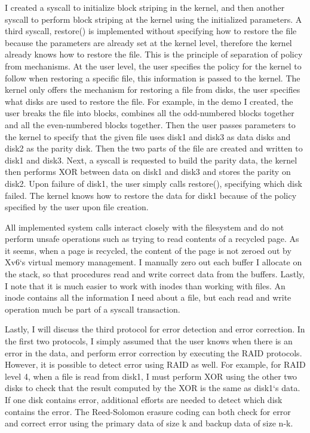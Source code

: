 I created a syscall to initialize block striping in the kernel, and then another syscall to perform block striping at the kernel using the initialized parameters. A third syscall, restore() is implemented without specifying how to restore the file because the parameters are already set at the kernel level, therefore the kernel already knows how to restore the file. This is the principle of separation of policy from mechanisms. At the user level, the user specifies the policy for the kernel to follow when restoring a specific file, this information is passed to the kernel. The kernel only offers the mechanism for restoring a file from disks, the user specifies what disks are used to restore the file. For example, in the demo I created, the user breaks the file into blocks, combines all the odd-numbered blocks together and all the even-numbered blocks together. Then the user passes parameters to the kernel to specify that the given file uses disk1 and disk3 as data disks and disk2 as the parity disk. Then the two parts of the file are created and written to disk1 and disk3. Next, a syscall is requested to build the parity data, the kernel then performs XOR between data on disk1 and disk3 and stores the parity on disk2. Upon failure of disk1, the user simply calls restore(), specifying which disk failed. The kernel knows how to restore the data for disk1 because of the policy specified by the user upon file creation. 

All implemented system calls interact closely with the filesystem and do not perform unsafe operations such as trying to read contents of a recycled page. As it seems, when a page is recycled, the content of the page is not zeroed out by Xv6`s virtual memory management. I manually zero out each buffer I allocate on the stack, so that procedures read and write correct data from the buffers. Lastly, I note that it is much easier to work with inodes than working with files. An inode contains all the information I need about a file, but each read and write operation much be part of a syscall transaction. 

Lastly, I will discuss the third protocol for error detection and error correction. In the first two protocols, I simply assumed that the user knows when there is an error in the data, and perform error correction by executing the RAID protocols. However, it is possible to detect error using RAID as well. For example, for RAID level 4, when a file is read from disk1, I must perform XOR using the other two disks to check that the result computed by the XOR is the same as disk1`s data. If one disk contains error, additional efforts are needed to detect which disk contains the error. The Reed-Solomon erasure coding can both check for error and correct error using the primary data of size k and backup data of size n-k.


